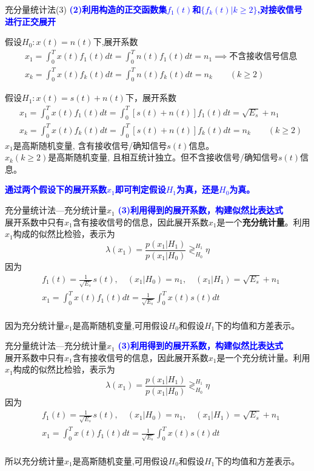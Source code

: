 \begin{frame}[shrink]{充分量统计法(3)}
\textbf{\textcolor{blue}{(2)利用构造的正交函数集$f_1(t)$和$\{f_k(t)|k\ge 2\}$,对接收信号进行正交展开}}
\begin{block}{假设$H_0:x(t)=n(t)$下,展开系数}
\begin{align*}
&x_1=\int_{0}^{T}x(t)f_1(t)dt=\int_{0}^{T}n(t)f_1(t)dt=n_1\implies\text{不含接收信号信息}\\
&x_k=\int_{0}^{T}x(t)f_k(t)dt=\int_{0}^{T}n(t)f_k(t)dt=n_k\qquad (k\ge 2)
\end{align*}
\end{block}
\begin{block}{假设$H_1:x(t)=s(t)+n(t)$下，展开系数}
\begin{align*}
&x_1=\int_{0}^{T}x(t)f_1(t)dt=\int_{0}^{T}[s(t)+n(t)]f_1(t)dt=\sqrt{E_s}+n_1\\
&x_k=\int_{0}^{T}x(t)f_k(t)dt=\int_{0}^{T}[s(t)+n(t)]f_k(t)dt=n_k\qquad (k\ge 2)
\end{align*}
$x_1$是高斯随机变量, 含有接收信号/确知信号$s(t)$信息。\\
$x_k(k\ge 2)$是高斯随机变量, 且相互统计独立。但不含接收信号/确知信号$s(t)$信息。
\end{block}
\textbf{\textcolor{blue}{通过两个假设下的展开系数$x_1$即可判定假设$H_1$为真，还是$H_0$为真。}}
\end{frame}

\begin{frame}[shrink]{充分量统计法---充分统计量$x_1$}
\textbf{\textcolor{blue}{(3)利用得到的展开系数，构建似然比表达式
}}\\
展开系数中只有$x_1$含有接收信号的信息，因此展开系数$x_1$是一个\textbf{充分统计量}。利用$x_1$构成的似然比检验，表示为
\[\lambda(x_1)=\frac{p(x_1|H_1)}{p(x_1|H_0)}\mathop{\gtrless}_{H_0}^{H_1}\eta\]
因为
\begin{align*}
&f_1(t)=\frac{1}{\sqrt{E_s}}s(t),\quad (x_1|H_0)=n_1,\quad (x_1|H_1)=\sqrt{E_s}+n_1\\ &x_1=\int_{0}^{T}x(t)f_1(t)dt=\frac{1}{\sqrt{E_s}}\int_{0}^{T}x(t)s(t)dt
\end{align*}
~\\
因为充分统计量$x_1$是高斯随机变量,可用假设$H_0$和假设$H_1$下的均值和方差表示。
\end{frame}

\begin{frame}[shrink]{充分量统计法---充分统计量$x_1$}
\textbf{\textcolor{blue}{(3)利用得到的展开系数，构建似然比表达式
}}\\
展开系数中只有$x_1$含有接收信号的信息，因此展开系数$x_1$是一个充分统计量。利用$x_1$构成的似然比检验，表示为
\[\lambda(x_1)=\frac{p(x_1|H_1)}{p(x_1|H_0)}\mathop{\gtrless}_{H_0}^{H_1}\eta\]
因为
\begin{align*}
&f_1(t)=\frac{1}{\sqrt{E_s}}s(t),\quad (x_1|H_0)=n_1,\quad (x_1|H_1)=\sqrt{E_s}+n_1\\ &x_1=\int_{0}^{T}x(t)f_1(t)dt=\frac{1}{\sqrt{E_s}}\int_{0}^{T}x(t)s(t)dt
\end{align*}
~\\
所以充分统计量$x_1$是高斯随机变量,可用假设$H_0$和假设$H_1$下的均值和方差表示。
\end{frame}

